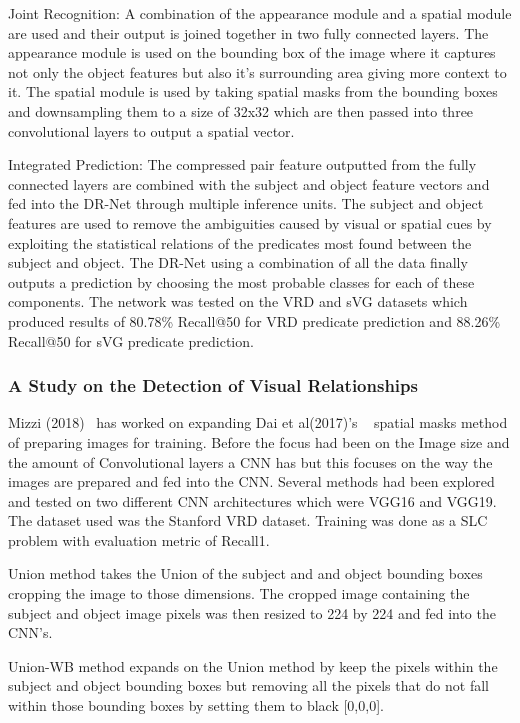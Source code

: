 \documentclass{csfyp}
\begin{document}
Joint Recognition:
A combination of the appearance module and a spatial module are used and their output is joined together in two fully connected layers. The appearance module is used on the bounding box of the image where it captures not only the object features but also it’s surrounding area giving more context to it. The spatial module is used by taking spatial masks from the bounding boxes and downsampling them to a size of 32x32 which are then passed into three convolutional layers to output a spatial vector. 

Integrated Prediction:
The compressed pair feature outputted from the fully connected layers are combined with the subject and object feature vectors and fed into the DR-Net through multiple inference units. The subject and object features are used to remove the ambiguities caused by visual or spatial cues by exploiting the statistical relations of the \Gls{predicate}s most found between the subject and object. The DR-Net using a combination of all the data finally outputs a prediction by choosing the most probable classes for each of these components. 
The network was tested on the VRD and sVG datasets which produced results of 80.78\% Recall@50 for VRD \Gls{predicate} prediction and 88.26\% Recall@50 for sVG \Gls{predicate} prediction.


\subsubsection{A Study on the Detection of Visual Relationships}
Mizzi (2018)~\cite{detectionRelationships} has worked on expanding Dai et al(2017)'s ~\cite{Dai2017DetectingVR} spatial masks method of preparing images for training. Before the focus had been on the Image size and the amount of Convolutional layers a CNN has but this focuses on the way the images are prepared and fed into the CNN. Several methods had been explored and tested on two different CNN architectures which were VGG16 and VGG19. The dataset used was the Stanford VRD dataset.  Training was done as a SLC problem with evaluation metric of \Gls{Recall1}.

Union method takes the Union of the subject and and object bounding boxes cropping the image to those dimensions. The cropped image containing the subject and object image pixels was then resized to 224 by 224 and fed into the CNN’s.

Union-WB method expands on the Union method by keep the pixels within the subject and object bounding boxes but removing all the pixels that do not fall within those bounding boxes by setting them to black [0,0,0]. 
\end{document}
